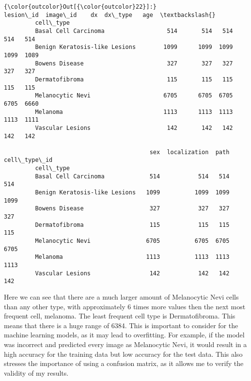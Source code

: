 \documentclass[11pt]{article}
\begin{document}
\begin{Verbatim}[commandchars=\\\{\}]
{\color{outcolor}Out[{\color{outcolor}22}]:}                                 lesion\_id  image\_id    dx  dx\_type   age  \textbackslash{}
         cell\_type                                                                  
         Basal Cell Carcinoma                  514       514   514      514   514   
         Benign Keratosis-like Lesions        1099      1099  1099     1099  1089   
         Bowens Disease                        327       327   327      327   327   
         Dermatofibroma                        115       115   115      115   115   
         Melanocytic Nevi                     6705      6705  6705     6705  6660   
         Melanoma                             1113      1113  1113     1113  1111   
         Vascular Lesions                      142       142   142      142   142   
         
                                          sex  localization  path  cell\_type\_id  
         cell\_type                                                               
         Basal Cell Carcinoma             514           514   514           514  
         Benign Keratosis-like Lesions   1099          1099  1099          1099  
         Bowens Disease                   327           327   327           327  
         Dermatofibroma                   115           115   115           115  
         Melanocytic Nevi                6705          6705  6705          6705  
         Melanoma                        1113          1113  1113          1113  
         Vascular Lesions                 142           142   142           142  
\end{Verbatim}
            
    Here we can see that there are a much larger amount of Melanocytic Nevi
cells than any other type, with approximately 6 times more values then
the next most frequent cell, melanoma. The least frequent cell type is
Dermatofibroma. This means that there is a huge range of 6384. This is
important to consider for the machine learning models, as it may lead to
overfitting. For example, if the model was incorrect and predicted every
image as Melanocytic Nevi, it would result in a high accuracy for the
training data but low accuracy for the test data. This also stresses the
importance of using a confusion matrix, as it allows me to verify the
validity of my results.
\end{document}
